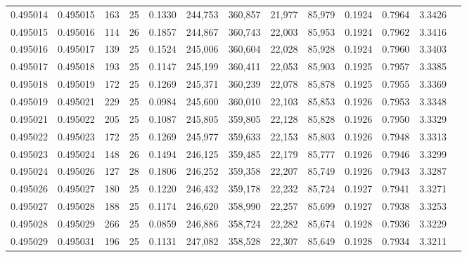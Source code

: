 \begin{tabular}{rrrrrrrrrrrrr}
0.495014 & 0.495015 & 163 &  25 &                                     0.1330 & 244,753 & 360,857 &  21,977 &  85,979 & 0.1924 & 0.7964 & 3.3426 \\
0.495015 & 0.495016 & 114 &  26 &                                     0.1857 & 244,867 & 360,743 &  22,003 &  85,953 & 0.1924 & 0.7962 & 3.3416 \\
0.495016 & 0.495017 & 139 &  25 &                                     0.1524 & 245,006 & 360,604 &  22,028 &  85,928 & 0.1924 & 0.7960 & 3.3403 \\
0.495017 & 0.495018 & 193 &  25 &                                     0.1147 & 245,199 & 360,411 &  22,053 &  85,903 & 0.1925 & 0.7957 & 3.3385 \\
0.495018 & 0.495019 & 172 &  25 &                                     0.1269 & 245,371 & 360,239 &  22,078 &  85,878 & 0.1925 & 0.7955 & 3.3369 \\
0.495019 & 0.495021 & 229 &  25 &                                     0.0984 & 245,600 & 360,010 &  22,103 &  85,853 & 0.1926 & 0.7953 & 3.3348 \\
0.495021 & 0.495022 & 205 &  25 &                                     0.1087 & 245,805 & 359,805 &  22,128 &  85,828 & 0.1926 & 0.7950 & 3.3329 \\
0.495022 & 0.495023 & 172 &  25 &                                     0.1269 & 245,977 & 359,633 &  22,153 &  85,803 & 0.1926 & 0.7948 & 3.3313 \\
0.495023 & 0.495024 & 148 &  26 &                                     0.1494 & 246,125 & 359,485 &  22,179 &  85,777 & 0.1926 & 0.7946 & 3.3299 \\
0.495024 & 0.495026 & 127 &  28 &                                     0.1806 & 246,252 & 359,358 &  22,207 &  85,749 & 0.1926 & 0.7943 & 3.3287 \\
0.495026 & 0.495027 & 180 &  25 &                                     0.1220 & 246,432 & 359,178 &  22,232 &  85,724 & 0.1927 & 0.7941 & 3.3271 \\
0.495027 & 0.495028 & 188 &  25 &                                     0.1174 & 246,620 & 358,990 &  22,257 &  85,699 & 0.1927 & 0.7938 & 3.3253 \\
0.495028 & 0.495029 & 266 &  25 &                                     0.0859 & 246,886 & 358,724 &  22,282 &  85,674 & 0.1928 & 0.7936 & 3.3229 \\
0.495029 & 0.495031 & 196 &  25 &                                     0.1131 & 247,082 & 358,528 &  22,307 &  85,649 & 0.1928 & 0.7934 & 3.3211 \\

\end{tabular}
